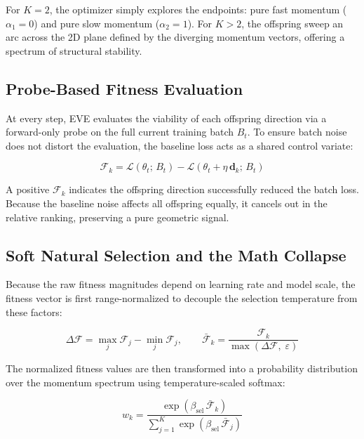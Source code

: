 \documentclass[12pt]{article}
\begin{document}
For $K=2$, the optimizer simply explores the endpoints: pure fast momentum ($\alpha_1 = 0$) and pure slow momentum ($\alpha_2 = 1$). For $K > 2$, the offspring sweep an arc across the 2D plane defined by the diverging momentum vectors, offering a spectrum of structural stability.

\subsection{Probe-Based Fitness Evaluation}
At every step, EVE evaluates the viability of each offspring direction via a forward-only probe on the full current training batch $B_t$. To ensure batch noise does not distort the evaluation, the baseline loss acts as a shared control variate:

\begin{equation}
  \mathcal{F}_k = \mathcal{L}(\theta_t;\, B_t) - \mathcal{L}(\theta_t + \eta\,\mathbf{d}_k;\, B_t)
  \label{eq:fitness}
\end{equation}

A positive $\mathcal{F}_k$ indicates the offspring direction successfully reduced the batch loss. Because the baseline noise affects all offspring equally, it cancels out in the relative ranking, preserving a pure geometric signal.

\subsection{Soft Natural Selection and the Math Collapse}
Because the raw fitness magnitudes depend on learning rate and model scale, the fitness vector is first range-normalized to decouple the selection temperature from these factors:

\begin{equation}
  \Delta\mathcal{F} = \max_j \mathcal{F}_j - \min_j \mathcal{F}_j, \qquad
  \bar{\mathcal{F}}_k = \frac{\mathcal{F}_k}{\max(\Delta\mathcal{F},\;\varepsilon)}
  \label{eq:fitness-norm}
\end{equation}

The normalized fitness values are then transformed into a probability distribution over the momentum spectrum using temperature-scaled softmax:

\begin{equation}
  w_k = \frac{\exp(\beta_{\mathrm{sel}}\,\bar{\mathcal{F}}_k)}{\sum_{j=1}^{K} \exp(\beta_{\mathrm{sel}}\,\bar{\mathcal{F}}_j)}
  \label{eq:selection}
\end{equation}
\end{document}
